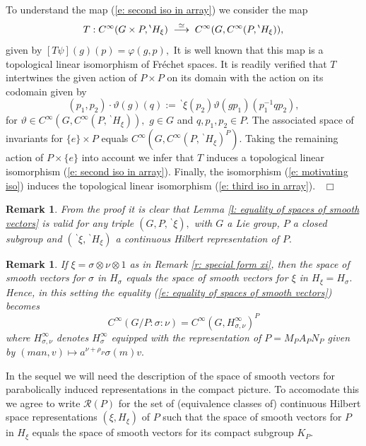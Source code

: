 \documentclass[12pt,a4paper]{article}
\newtheorem{Rem}[Thm]{Remark}
\newenvironment{rem}[0]{\begin{Rem}\noindent\rm}%
{\end{Rem}}
\def\qed{~\hfill\hbox{$\Box$}\medbreak}
\def\gf{\varphi}
\def\gs{\sigma}
\def\cR{{\mathcal R}}
\numberwithin{Thm}{section}
\numberwithin{equation}{section}
\numberwithin{equation}{section}
\def\bp{\!{\,}^\backprime}
\begin{document}
To understand the map (\ref{e: second iso in array}) we consider the map 
$$
T: C^\infty(G\times P, \bp H_\xi)\;\; {\buildrel \simeq \over \longrightarrow}\;\; 
C^\infty(G, C^\infty(P, \bp H_\xi)),
$$%
given by $[T\psi](g)(p) = \gf(g,p),$  It is well known that this map is a 
topological linear isomorphism of Fr\'echet spaces.
It is readily verified that $T$ intertwines the given action of $P \times P$ 
on its domain with the action on its codomain given by 
$$ 
(p_1, p_2)\cdot \vartheta(g)(q) := \bp \xi(p_2) \vartheta(gp_1)(p_1^{-1} q p_2),
$$%
for $\vartheta \in C^\infty(G, C^\infty(P, \bp H_\xi)),$  $g \in G$ and $q,p_1,p_2 \in P.$ 
The associated space of invariants for $\{e\}\times P$ equals
$C^\infty(G, C^\infty(P, \bp H_\xi)^P).$ Taking the remaining action of $P\times \{e\}$ 
into account we infer that $T$ induces a topological linear isomorphism
(\ref{e: second iso in array}). 
Finally, the isomorphism (\ref{e: motivating iso}) induces the 
topological linear isomorphism  (\ref{e: third iso in array}).
\qed
\begin{rem}
\label{r: generality of result}
From the proof it is clear that  Lemma \ref{l: equality of spaces of smooth vectors} is valid for any 
triple $(G, P, \bp \xi),$ with $G$ a Lie group, $P$ a closed subgroup and 
$(\bp \xi, \bp H_\xi)$ a continuous Hilbert representation of $P.$
\end{rem}




\begin{rem}
If $\xi = \gs \otimes \nu \otimes 1$ as in Remark \ref{r: special form xi},
then the space of smooth vectors for $\gs$  in $H_\gs$ equals the space
of smooth vectors  for $\xi$ in $H_\xi = H_\gs.$ 
Hence, in this setting the equality (\ref{e: equality of spaces of smooth vectors})
becomes
$$ 
C^\infty(G/P: \gs :\nu) =  C^\infty(G, H_{\gs,\nu}^\infty)^P
$$%
where $H_{\gs, \nu}^\infty$ denotes  $H_\gs^\infty$ 
equipped with the representation of $P = M_P A_P N_P$ given by 
$(man,v) \mapsto a^{\nu + \rho_P}\gs(m) v.$ 
\end{rem} 




In the sequel we will need the description of the space of smooth vectors for 
parabolically induced representations in the compact picture. To accomodate this we agree to
write $\cR(P)$ for the set of (equivalence classes of) 
continuous Hilbert space  representations $(\xi, H_\xi)$ of $P$ such that
the space of smooth vectors for $P$ in $H_\xi$ equals the space of smooth vectors
for its compact subgroup $K_P.$
\end{document}
